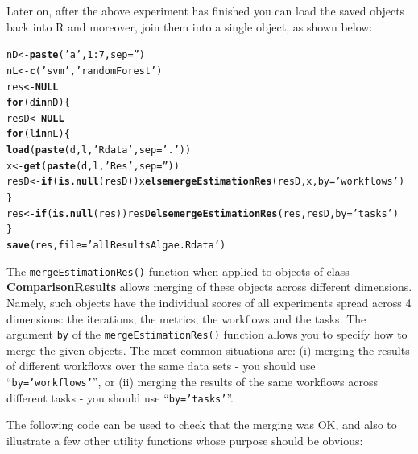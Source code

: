 \documentclass[10pt,a4paper]{article}\usepackage[]{graphicx}\usepackage[]{color}
\makeatletter
\newcommand{\hlnum}[1]{\textcolor[rgb]{0.686,0.059,0.569}{#1}}%
\newcommand{\hlstr}[1]{\textcolor[rgb]{0.192,0.494,0.8}{#1}}%
\newcommand{\hlopt}[1]{\textcolor[rgb]{0,0,0}{#1}}%
\newcommand{\hlstd}[1]{\textcolor[rgb]{0.345,0.345,0.345}{#1}}%
\newcommand{\hlkwa}[1]{\textcolor[rgb]{0.161,0.373,0.58}{\textbf{#1}}}%
\newcommand{\hlkwb}[1]{\textcolor[rgb]{0.69,0.353,0.396}{#1}}%
\newcommand{\hlkwc}[1]{\textcolor[rgb]{0.333,0.667,0.333}{#1}}%
\newcommand{\hlkwd}[1]{\textcolor[rgb]{0.737,0.353,0.396}{\textbf{#1}}}%
\newenvironment{kframe}{%
 \def\at@end@of@kframe{}%
 \ifinner\ifhmode%
  \def\at@end@of@kframe{\end{minipage}}%
  \begin{minipage}{\columnwidth}%
 \fi\fi%
 \def\FrameCommand##1{\hskip\@totalleftmargin \hskip-\fboxsep
 \colorbox{shadecolor}{##1}\hskip-\fboxsep
     \hskip-\linewidth \hskip-\@totalleftmargin \hskip\columnwidth}%
 \MakeFramed {\advance\hsize-\width
   \@totalleftmargin\z@ \linewidth\hsize
   \@setminipage}}%
 {\par\unskip\endMakeFramed%
 \at@end@of@kframe}
\newenvironment{knitrout}{}{} %
\makeatother
\begin{document}
Later on, after the above experiment has finished you can load the saved objects back 
into R and moreover, join them into a single object, as shown below:

\begin{knitrout}\footnotesize
{}\color{fgcolor}\begin{kframe}
\begin{alltt}
\hlstd{nD} \hlkwb{<-} \hlkwd{paste}\hlstd{(}\hlstr{'a'}\hlstd{,}\hlnum{1}\hlopt{:}\hlnum{7}\hlstd{,}\hlkwc{sep}\hlstd{=}\hlstr{''}\hlstd{)}
\hlstd{nL} \hlkwb{<-} \hlkwd{c}\hlstd{(}\hlstr{'svm'}\hlstd{,}\hlstr{'randomForest'}\hlstd{)}
\hlstd{res} \hlkwb{<-} \hlkwa{NULL}
\hlkwa{for}\hlstd{(d} \hlkwa{in} \hlstd{nD) \{}
  \hlstd{resD} \hlkwb{<-} \hlkwa{NULL}
  \hlkwa{for}\hlstd{(l} \hlkwa{in} \hlstd{nL) \{}
    \hlkwd{load}\hlstd{(}\hlkwd{paste}\hlstd{(d,l,}\hlstr{'Rdata'}\hlstd{,}\hlkwc{sep}\hlstd{=}\hlstr{'.'}\hlstd{))}
    \hlstd{x} \hlkwb{<-} \hlkwd{get}\hlstd{(}\hlkwd{paste}\hlstd{(d,l,}\hlstr{'Res'}\hlstd{,}\hlkwc{sep}\hlstd{=}\hlstr{''}\hlstd{))}
    \hlstd{resD} \hlkwb{<-} \hlkwa{if} \hlstd{(}\hlkwd{is.null}\hlstd{(resD)) x} \hlkwa{else} \hlkwd{mergeEstimationRes}\hlstd{(resD,x,}\hlkwc{by}\hlstd{=}\hlstr{'workflows'}\hlstd{)}
  \hlstd{\}}
  \hlstd{res} \hlkwb{<-} \hlkwa{if} \hlstd{(}\hlkwd{is.null}\hlstd{(res)) resD} \hlkwa{else} \hlkwd{mergeEstimationRes}\hlstd{(res,resD,}\hlkwc{by}\hlstd{=}\hlstr{'tasks'}\hlstd{)}
\hlstd{\}}
\hlkwd{save}\hlstd{(res,}\hlkwc{file}\hlstd{=}\hlstr{'allResultsAlgae.Rdata'}\hlstd{)}
\end{alltt}
\end{kframe}
\end{knitrout}


The \texttt{mergeEstimationRes()}  function when applied to objects of class
\textbf{ComparisonResults} allows merging of these objects across different
dimensions. Namely, such objects have the individual scores of all
experiments spread across 4 dimensions: the iterations, the
metrics, the workflows and the tasks. The argument
\texttt{by} of the \texttt{mergeEstimationRes()} function allows you to specify how
to merge the given objects. The most common situations are: (i)
merging the results of different workflows over the same data sets -
you should use ``\texttt{by='workflows'}'', or (ii) merging the results
of the same workflows across different tasks - you should use
``\texttt{by='tasks'}''.

The following code can be used to check that the merging was OK, and
also to illustrate a few other utility functions whose purpose should
be obvious:
\end{document}
